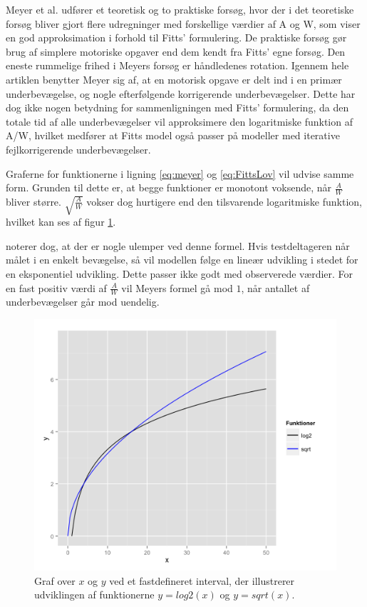 Meyer et al. udfører et teoretisk og to praktiske forsøg, hvor der i det teoretiske forsøg bliver gjort flere udregninger med forskellige værdier af A og W, som viser en god approksimation i forhold til Fitts' formulering. De praktiske forsøg gør brug af simplere motoriske opgaver end dem kendt fra Fitts' egne forsøg. Den eneste rummelige frihed i Meyers forsøg er håndledenes rotation. Igennem hele artiklen benytter Meyer sig af, at en motorisk opgave er delt ind i en primær underbevægelse, og nogle efterfølgende korrigerende underbevægelser. Dette har dog ikke nogen betydning for sammenligningen med Fitts’ formulering, da den totale tid af alle underbevægelser vil approksimere den logaritmiske funktion af A/W, hvilket medfører at Fitts model også passer på modeller med iterative fejlkorrigerende underbevægelser.

Graferne for funktionerne i ligning \ref{eq:meyer} og \ref{eq:FittsLov} vil udvise samme form. Grunden til dette er, at begge funktioner er monotont voksende, når $\frac{A}{W}$ bliver større. $\sqrt{\frac{A}{W}}$ vokser dog hurtigere end den tilsvarende logaritmiske funktion, hvilket kan ses af figur \ref{fig:log_vs_sqrt}. 

\cite{goldberg2015} noterer dog, at der er nogle ulemper ved denne formel. Hvis testdeltageren når målet i en enkelt bevægelse, så vil modellen følge en lineær udvikling i stedet for en eksponentiel udvikling. Dette passer ikke godt med observerede værdier. For en fast positiv værdi af $\frac{A}{W}$ vil Meyers formel gå mod $1$, når antallet af underbevægelser går mod uendelig.

\begin{figure}[h]
\centering
\includegraphics[width=.7\linewidth]{images/illustrations/meyer_plot_comparison}
\caption{Graf over $x$ og $y$ ved et fastdefineret interval, der illustrerer udviklingen af funktionerne $y=log2(x)$ og $y=sqrt(x)$.}
\label{fig:log_vs_sqrt}
\end{figure}

